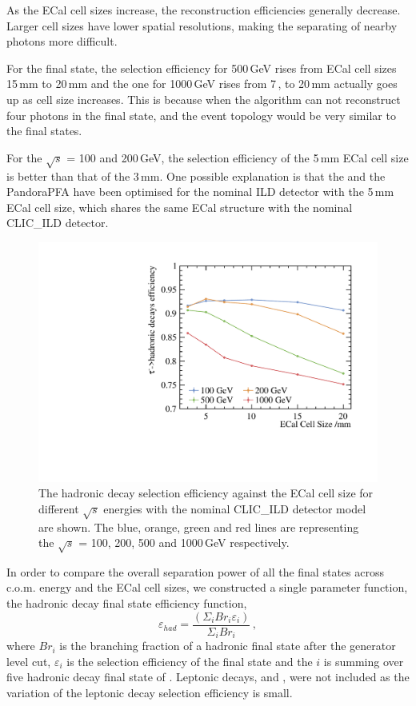 \documentclass[a4paper,11pt]{article}
\newcommand{\decayElectron}{\Pem\PAGne\PGnGt}
\newcommand{\decayMuon}{\PGmm\PAGnGm\PGnGt}
\newcommand{\decayRho}{\PGrP{\PGpm\PGpz}\PGnGt}
\newcommand{\decayAiPhoton}{\PaDoP{\PGpm\PGpz\PGpz}\PGnGt}
\newcommand{\rootS}{\ensuremath{\sqrt{s}} }
\begin{document}
As the ECal cell sizes increase, the reconstruction efficiencies generally decrease. Larger cell sizes have lower spatial resolutions, making the separating of nearby photons more difficult.

For the \decayAiPhoton final state, the selection efficiency for 500\,GeV rises from ECal cell sizes 15\,mm to 20\,mm and the one for 1000\,GeV rises from 7\,, to 20\,mm actually goes up as cell size increases. This is because when the algorithm can not reconstruct four photons in the \decayAiPhoton final state, and the event topology would be very similar to the \decayRho final states. 

For the \rootS = 100 and 200\,GeV, the selection efficiency of the 5\,mm ECal cell size is better than that of the 3\,mm. One possible explanation is that the  and the PandoraPFA have been optimised for the nominal ILD detector with the 5\,mm ECal cell size, which shares the same ECal structure with the nominal CLIC\_ILD detector.

\begin{figure}[htbp]
\centering %
\includegraphics[width=.45\textwidth]{plots/hadronicEff}
\caption{\label{fig:hadronic_efficiency} The \PGt hadronic decay selection efficiency against the ECal cell size for different \rootS energies with the nominal CLIC\_ILD detector model are shown. The blue, orange, green and red lines are representing the \rootS = 100, 200, 500 and 1000\,GeV respectively.}
\end{figure}

In order to compare the overall separation power of all the final states across c.o.m. energy and the ECal cell sizes, we constructed a single parameter function, the  \PGt hadronic decay final state efficiency function, 
\begin{equation}
\label{eq:had}
\varepsilon_{had} = \frac{\left(\Sigma_{i} {Br}_{i}\varepsilon_{i}\right)}{\Sigma_{i} {Br}_{i}}  \,,
\end{equation}
where $Br_{i}$ is the branching fraction of a hadronic final state after the generator level cut, $\varepsilon_{i}$ is the selection efficiency of the final state and the $i$ is summing over five hadronic decay final state of \PGt. Leptonic decays, \decayElectron and \decayMuon, were not included as the variation of the leptonic decay selection efficiency is small.
\end{document}
